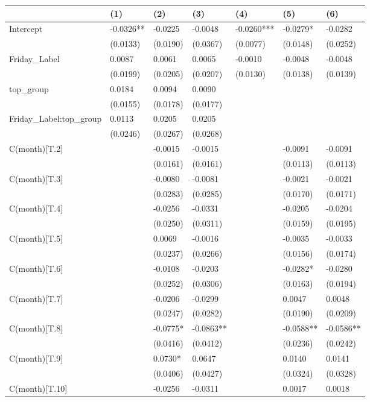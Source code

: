 \begin{tabular}{lllllll}
\toprule
 & (1) & (2) & (3) & (4) & (5) & (6) \\
\midrule
Intercept & -0.0326** & -0.0225 & -0.0048 & -0.0260*** & -0.0279* & -0.0282 \\
 & (0.0133) & (0.0190) & (0.0367) & (0.0077) & (0.0148) & (0.0252) \\
Friday_Label & 0.0087 & 0.0061 & 0.0065 & -0.0010 & -0.0048 & -0.0048 \\
 & (0.0199) & (0.0205) & (0.0207) & (0.0130) & (0.0138) & (0.0139) \\
top_group & 0.0184 & 0.0094 & 0.0090 &  &  &  \\
 & (0.0155) & (0.0178) & (0.0177) &  &  &  \\
Friday_Label:top_group & 0.0113 & 0.0205 & 0.0205 &  &  &  \\
 & (0.0246) & (0.0267) & (0.0268) &  &  &  \\
C(month)[T.2] &  & -0.0015 & -0.0015 &  & -0.0091 & -0.0091 \\
 &  & (0.0161) & (0.0161) &  & (0.0113) & (0.0113) \\
C(month)[T.3] &  & -0.0080 & -0.0081 &  & -0.0021 & -0.0021 \\
 &  & (0.0283) & (0.0285) &  & (0.0170) & (0.0171) \\
C(month)[T.4] &  & -0.0256 & -0.0331 &  & -0.0205 & -0.0204 \\
 &  & (0.0250) & (0.0311) &  & (0.0159) & (0.0195) \\
C(month)[T.5] &  & 0.0069 & -0.0016 &  & -0.0035 & -0.0033 \\
 &  & (0.0237) & (0.0266) &  & (0.0156) & (0.0174) \\
C(month)[T.6] &  & -0.0108 & -0.0203 &  & -0.0282* & -0.0280 \\
 &  & (0.0252) & (0.0306) &  & (0.0163) & (0.0194) \\
C(month)[T.7] &  & -0.0206 & -0.0299 &  & 0.0047 & 0.0048 \\
 &  & (0.0247) & (0.0282) &  & (0.0190) & (0.0209) \\
C(month)[T.8] &  & -0.0775* & -0.0863** &  & -0.0588** & -0.0586** \\
 &  & (0.0416) & (0.0412) &  & (0.0236) & (0.0242) \\
C(month)[T.9] &  & 0.0730* & 0.0647 &  & 0.0140 & 0.0141 \\
 &  & (0.0406) & (0.0427) &  & (0.0324) & (0.0328) \\
C(month)[T.10] &  & -0.0256 & -0.0311 &  & 0.0017 & 0.0018 \\

\end{tabular}
